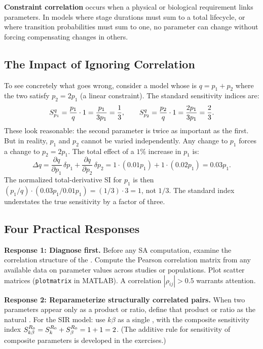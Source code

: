 \textbf{Constraint correlation} occurs when a physical or
biological requirement links parameters.
In models where stage durations must sum to a total
lifecycle, or where transition probabilities must sum to one,
no parameter can change without forcing compensating changes
in others.

\subsection{The Impact of Ignoring Correlation}

To see concretely what goes wrong, consider a model whose \QOI is
$q = p_1 + p_2$ where the two \POIs satisfy $p_2 = 2p_1$
(a linear constraint). The standard sensitivity indices are:
\[
  S_{p_1}^{q} = \frac{p_1}{q}\cdot 1 = \frac{p_1}{3p_1} = \frac{1}{3},
  \qquad
  S_{p_2}^{q} = \frac{p_2}{q}\cdot 1 = \frac{2p_1}{3p_1} = \frac{2}{3}.
\]
These look reasonable: the second parameter is twice as important
as the first. But in reality, $p_1$ and $p_2$ cannot be varied
independently. Any change to $p_1$ forces a change to $p_2 = 2p_1$.
The total effect of a $1\%$ increase in $p_1$ is:
\[
  \Delta q = \frac{\partial q}{\partial p_1}\,\delta p_1
           + \frac{\partial q}{\partial p_2}\,\delta p_2
           = 1\cdot(0.01p_1) + 1\cdot(0.02p_1) = 0.03p_1.
\]
The normalized total-derivative SI for $p_1$ is then
$(p_1/q)\cdot(0.03p_1/0.01p_1) = (1/3)\cdot 3 = 1$, not $1/3$.
The standard index understates the true sensitivity by a factor of three.

\subsection{Four Practical Responses}

\textbf{Response 1: Diagnose first.}
Before any SA computation, examine the correlation structure
of the \POIs. Compute the Pearson correlation matrix from any
available data on parameter values across studies or populations.
Plot scatter matrices (\texttt{plotmatrix} in MATLAB).
A correlation $|\rho_{ij}| > 0.5$ warrants attention.

\textbf{Response 2: Reparameterize structurally correlated pairs.}
When two parameters appear only as a product or ratio,
define that product or ratio as the natural \POI.
For the SIR model: use $k\beta$ as a single \POI, with
the composite sensitivity index
$S_{k\beta}^{R_0} = S_{k}^{R_0} + S_{\beta}^{R_0} = 1 + 1 = 2$.
(The additive rule for sensitivity of composite parameters
is developed in the exercises.)

